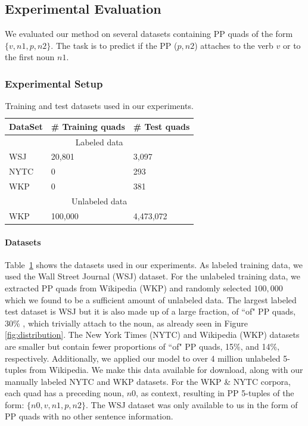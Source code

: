 
\subsection{Experimental Evaluation}
We evaluated our method on several datasets containing PP quads of the form $\{v,n1,p,n2\}$.   The task is to predict if the  PP ($p,n2$) attaches to the verb $v$ or to the first noun $n1$. 


\subsubsection{Experimental Setup}\label{experimentalsetup}

\begin{table}[t]
%
\centering
%
\begin{tabular}{|l|l|l|}
\hline
{\bf DataSet} &  {\bf  \# Training quads} & {\bf \# Test quads} \\
\hline
\multicolumn{3}{|c|}{Labeled data} \\
    \hline
WSJ &  20,801 & 3,097 \\
NYTC & 0 & 293  \\
 WKP & 0 & 381  \\
      \hline
 \multicolumn{3}{|c|}{Unlabeled data} \\
      \hline
          WKP  & 100,000 & 4,473,072 \\
         
\hline
\end{tabular}
\caption{Training and test datasets used in our experiments. }
\label{tab:datasets}
\end{table}
     
    
     
\paragraph{Datasets}
Table~\ref{tab:datasets} shows the datasets used in our experiments. 
As labeled training data, we used the Wall Street Journal  (WSJ) dataset. For the unlabeled  training data, we extracted  PP quads from Wikipedia (WKP) and randomly selected $100,000$ which we found  to be a sufficient amount of unlabeled data.
The largest labeled test dataset is  WSJ
but it is also made up of a large fraction, of  ``of" PP quads, 30\% , which trivially attach to the noun, as already seen  in Figure \ref{fig:distribution}.
 The New York Times (NYTC) and Wikipedia (WKP) datasets are  smaller but contain fewer proportions  of ``of" PP quads, 15\%,  and 14\%, respectively. 
  Additionally, we applied our  model to over 4 million unlabeled 5-tuples from Wikipedia. We make this data available for download,  along with our manually labeled NYTC and WKP datasets.
For the WKP \& NYTC corpora,  each quad has a  preceding noun, $n0$, as context, resulting in PP 5-tuples of the form:  $\{n0,v,n1,p,n2\}$. The WSJ dataset was only available to us in the form of  PP quads with no other sentence information.

